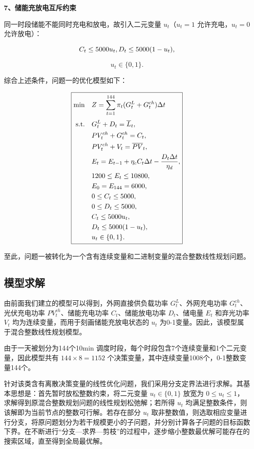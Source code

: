 \textbf{7、储能充放电互斥约束}

同一时段储能不能同时充电和放电，故引入二元变量 \(u_t\)（\(u_t=1\) 允许充电，\(u_t=0\) 允许放电）：

\[
C_t\leq5000u_t,\\
D_t\leq5000(1-u_t),
\]

\begin{equation}
u_t\in\{0,1\}.
\end{equation}

综合上述条件，问题一的优化模型如下：

\begin{equation}
\boxed{
\begin{aligned}
\min\quad
&Z=\sum_{t=1}^{144}
\pi_t(G_t^L+G_t^{ch})\Delta t \\[1mm]
{\rm s.t.}\quad
&G_t^L+D_t=\overline L_t,\\
&PV_t^{ch}+G_t^{ch}=C_t,\\
&PV_t^{ch}+V_t=\overline{PV}_t,\\
&E_t=E_{t-1}
+\eta_cC_t\Delta t
-\frac{D_t\Delta t}{\eta_d},\\
&1200\leq E_t\leq10800,\\
&E_0=E_{144}=6000,\\
&0\leq C_t\leq5000,\\
&0\leq D_t\leq5000,\\
&C_t\leq5000u_t,\\
&D_t\leq5000(1-u_t),\\
&u_t\in\{0,1\}.
\end{aligned}}
\end{equation}

至此，问题一被转化为一个含有连续变量和二进制变量的混合整数线性规划问题。

\subsection{模型求解}

由前面我们建立的模型可以得到，外网直接供负载功率 \(G_t^L\)、外网充电功率 \(G_t^{ch}\)、光伏充电功率 \(PV_t^{ch}\)、储能充电功率 \(C_t\)、储能放电功率 \(D_t\)、储电量 \(E_t\) 和弃光功率 \(V_t\) 均为连续变量，而用于刻画储能充放电状态的 \(u_t\) 为0-1变量。因此，该模型属于混合整数线性规划模型。

由于一天被划分为144个10min 调度时段，每个时段包含7个连续变量和1个二元变量，因此模型共有 \(144\times 8=1152\) 个决策变量，其中连续变量1008个，0-1整数变量144个。

针对该类含有离散决策变量的线性优化问题，我们采用分支定界法进行求解。其基本思想是：首先暂时放松整数约束，将二元变量 \(u_t\in\{0,1\}\) 放宽为 \(0\leq u_t\leq1\)， 求解得到原混合整数规划问题的线性规划松弛解；若所得 \(u_t\) 均满足整数条件，则该解即为当前节点的整数可行解。若存在部分 \(u_t\) 取非整数值，则选取相应变量进行分支，将原问题划分为若干规模更小的子问题，并分别计算各子问题的目标函数下界。在不断进行“分支—求界—剪枝”的过程中，逐步缩小整数最优解可能存在的搜索区域，直至得到全局最优解。

